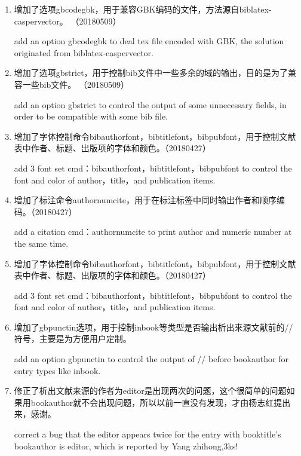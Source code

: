 
\label{up:180403}
\begin{enumerate}
\item 增加了选项gbcodegbk，用于兼容GBK编码的文件，方法源自biblatex-caspervector。 （20180509）

add an option gbcodegbk to deal tex file encoded with GBK, the solution originated from biblatex-caspervector.

\item 增加了选项gbstrict，用于控制bib文件中一些多余的域的输出，目的是为了兼容一些bib文件。 （20180509）

add an option gbstrict to control the output of some unnecessary fields, in order to be compatible with some bib file.

\item 增加了字体控制命令bibauthorfont，bibtitlefont，bibpubfont，用于控制文献表中作者、标题、出版项的字体和颜色。（20180427）

add 3 font set cmd：bibauthorfont，bibtitlefont，bibpubfont to control the font and color of author，title，and publication items.

\item 增加了标注命令authornumcite，用于在标注标签中同时输出作者和顺序编码。（20180427）

add a citation cmd：authornumcite to print author and numeric number at the same time.

\item 增加了字体控制命令bibauthorfont，bibtitlefont，bibpubfont，用于控制文献表中作者、标题、出版项的字体和颜色。（20180427）

add 3 font set cmd：bibauthorfont，bibtitlefont，bibpubfont to control the font and color of author，title，and publication items.

\item 增加了gbpunctin选项，用于控制inbook等类型是否输出析出来源文献前的//符号，主要是为方便用户定制。

add an option gbpunctin to control the output of // before bookauthor for entry types like inbook.

\item 修正了析出文献来源的作者为editor是出现两次的问题，这个很简单的问题如果用bookauthor就不会出现问题，所以以前一直没有发现，才由杨志红提出来，感谢。

correct a bug that the editor appears twice for the entry with booktitle's bookauthor is editor, which is reported by Yang zhihong,3ks!


\end{enumerate}
